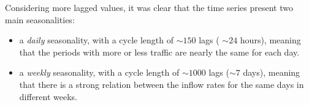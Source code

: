Considering more lagged values, it was clear that the time series present two main seasonalities:
\begin{itemize}
  \item a \emph{daily} seasonality, with a cycle length of \( \sim150 \) lags ( \( \sim24 \) hours), meaning that the periods with more or less traffic are nearly the same for each day.
  \item a \emph{weekly} seasonality, with a cycle length of \( \sim1000 \) lags (\( \sim7 \) days), meaning that there is a strong relation between the inflow rates for the same days in different weeks.
\end{itemize}


\clearpage